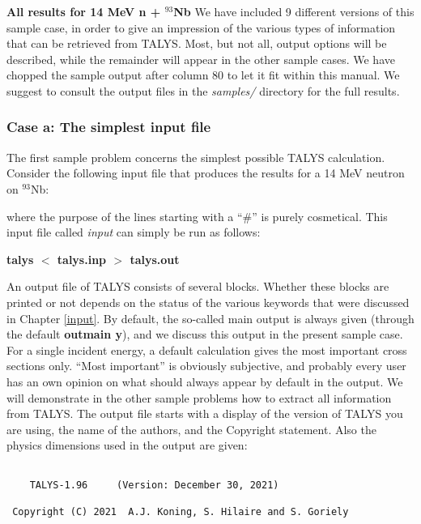 \begin{samplecase}
{\bf All results for 14 MeV n + ${}^{93}$Nb}\newline
We have included 9 different versions of this sample case, in order to give an 
impression of the various types of information that can be retrieved from 
TALYS.  Most, but not all, output options will be described, while the 
remainder will appear in the other sample cases. We have chopped the sample 
output after column 80 to let it fit within this manual. We suggest to consult 
the output files in the {\em samples/} directory for the full results.
\subsubsection{Case a: The simplest input file}
The first sample problem concerns the simplest possible TALYS calculation.
Consider the following input file that produces the
results for a 14 MeV neutron on ${}^{93}$Nb:


where the purpose of the lines starting with a ``\#'' is purely cosmetical.
This input file called {\em input} can simply be run as follows:\newline

{\bf talys $<$ talys.inp $>$ talys.out}\newline

An output file of TALYS consists of several blocks. Whether these blocks are 
printed or not depends on the status of the various keywords that were 
discussed in Chapter \ref{input}. By 
default, the so-called main output is always given (through the default
{\bf outmain y}), and we discuss this output in the present sample case.
For a single incident energy, a default calculation gives the most important 
cross sections only. ``Most important'' is obviously subjective, and probably
every user has an own opinion on what should always appear by default in 
the output. We will demonstrate in the other sample problems how to extract all 
information from TALYS. 
The output file starts with a display of the version of TALYS you are using,
the name of the authors, and the Copyright statement. Also the physics 
dimensions used in the output are given:

{\small \begin{verbatim}

    TALYS-1.96     (Version: December 30, 2021)

 Copyright (C) 2021  A.J. Koning, S. Hilaire and S. Goriely


\end{verbatim}}
\end{samplecase}
